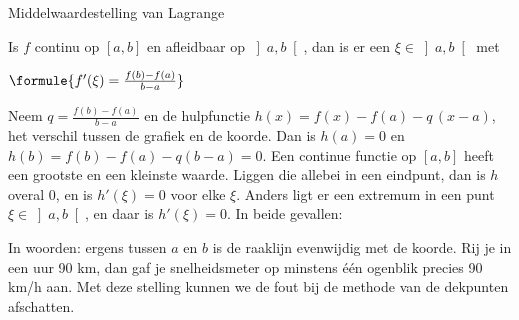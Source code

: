 \begin{theorie}
\begin{stelling}{Middelwaardestelling van Lagrange}
\begin{minipage}[t]{.62\linewidth}
\vspace{0pt}
Is $f$ continu op $[a, b]$ en afleidbaar op $\left]a, b\right[$, dan is er een $\xi \in \left]a, b\right[$ met

\vspace{1mm}
\qquad $\formule{f'(\xi) = \frac{f(b) - f(a)}{b - a}}$
\end{minipage}\hfill
\begin{minipage}[t]{.34\linewidth}
\vspace{0pt}
\end{minipage}
\end{stelling}

\begin{bewijs}
Neem $q = \frac{f(b) - f(a)}{b - a}$ en de hulpfunctie $h(x) = f(x) - f(a) - q\,(x - a)$, het verschil tussen de grafiek en de koorde. Dan is $h(a) = 0$ en $h(b) = f(b) - f(a) - q(b - a) = 0$. Een continue functie op $[a, b]$ heeft een grootste en een kleinste waarde. Liggen die allebei in een eindpunt, dan is $h$ overal 0, en is $h'(\xi) = 0$ voor elke $\xi$. Anders ligt er een extremum in een punt $\xi \in \left]a, b\right[$, en daar is $h'(\xi) = 0$. In beide gevallen:
\end{bewijs}
\end{theorie}

In woorden: ergens tussen $a$ en $b$ is de raaklijn evenwijdig met de koorde. Rij je in een uur 90 km, dan gaf je snelheidsmeter op minstens één ogenblik precies 90 km/h aan. Met deze stelling kunnen we de fout bij de methode van de dekpunten afschatten.

